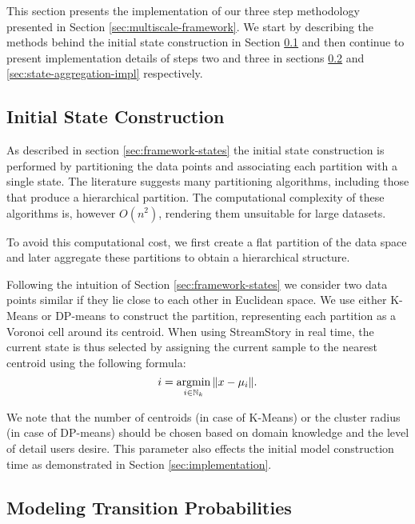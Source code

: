This section presents the implementation of our three step methodology presented in Section \ref{sec:multiscale-framework}.
We start by describing the methods behind the initial state construction in Section \ref{sec:state-construction-impl}
and then continue to present implementation details of steps two and three in sections \ref{sec:transition-probs-impl}
and \ref{sec:state-aggregation-impl} respectively.

\subsection{Initial State Construction}
\label{sec:state-construction-impl}

As described in section \ref{sec:framework-states} the initial state construction is performed by partitioning
the data points and associating each partition with a single state. The literature suggests many partitioning
algorithms, including those that produce a hierarchical partition. The computational complexity of these algorithms
is, however $O(n^2)$, rendering them unsuitable for large datasets.

To avoid this computational cost, we first create a flat partition of the data space and later aggregate these
partitions to obtain a hierarchical structure.

Following the intuition of Section \ref{sec:framework-states} we consider two data points similar if they lie close
to each other in Euclidean space. 
We use either K-Means or DP-means \cite{DBLP:journals/corr/abs-1111-0352} to construct the partition, representing each 
partition as a Voronoi cell around its centroid. When using StreamStory in real time, the current state is thus
selected by assigning the current sample to the nearest centroid using the following formula:
\begin{equation}
	\nonumber
	i = \argmin_{i \in \mathbb{N}_k} \|x - \mu_i\|.
\end{equation}

We note that the number of centroids (in case of K-Means) or the cluster radius (in case of DP-means) should
be chosen based on domain knowledge and the level of detail users desire. This parameter also effects the 
initial model construction time as demonstrated in Section \ref{sec:implementation}.

\subsection{Modeling Transition Probabilities}
\label{sec:transition-probs-impl}


